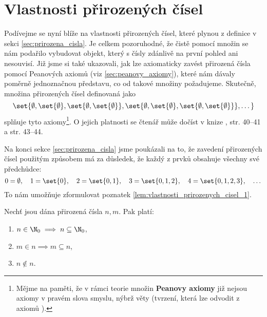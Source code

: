 \section{Vlastnosti přirozených čísel}\label{sec:vlastnosti_prirozenych_cisel}
Podívejme se nyní blíže na vlastnosti přirozených čísel, které plynou z definice v sekci \ref{sec:prirozena_cisla}. Je celkem pozoruhodné, že čistě pomocí množin se nám podařilo vybudovat objekt, který s čísly zdánlivě na první pohled ani nesouvisí. Již jsme si také ukazovali, jak lze axiomaticky zavést přirozená čísla pomocí Peanových axiomů (viz \ref{sec:peanovy_axiomy}), které nám dávaly poměrně jednoznačnou představu, co od takové množiny požadujeme. Skutečně, množina přirozených čísel definovaná jako
\begin{equation*}
    \set{\emptyset,\set{\emptyset},\set{\emptyset,\set{\emptyset}},\set{\emptyset,\set{\emptyset},\set{\emptyset,\set{\emptyset}}},\dots}
\end{equation*}
splňuje tyto axiomy\footnote{Mějme na paměti, že v rámci teorie množin \textbf{Peanovy axiomy} již nejsou axiomy v pravém slova smyslu, nýbrž věty (tvrzení, která lze odvodit z axiomů \ZF).}. O jejich platnosti se čtenář může dočíst v knize \cite{Goldrei2017}, str. 40--41 a str. 43--44.\par
Na konci sekce \ref{sec:prirozena_cisla} jsme poukázali na to, že zavedení přirozených čísel použitým způsobem má za důsledek, že každý z prvků obsahuje všechny své předchůdce:
\begin{equation*}
    0=\emptyset,\quad 1=\set{0},\quad 2=\set{0,1},\quad 3=\set{0,1,2},\quad 4=\set{0,1,2,3},\quad\dots
\end{equation*}
To nám umožňuje zformulovat poznatek \ref{lem:vlastnosti_prirozenych_cisel_1}.
\begin{lemma}\label{lem:vlastnosti_prirozenych_cisel_1}
    Nechť jsou dána přirozená čísla $n,m$. Pak platí:
    \begin{enumerate}[label=(\roman*)]
        \item\label{item:vlastnost_1_1} $n\in\N_0\implies n\subseteq\N_0$,
        \item\label{item:vlastnost_1_2} $m\in n\implies m\subseteq n$,
        \item\label{item:vlastnost_1_3} $n\notin n$.
    \end{enumerate}
\end{lemma}
